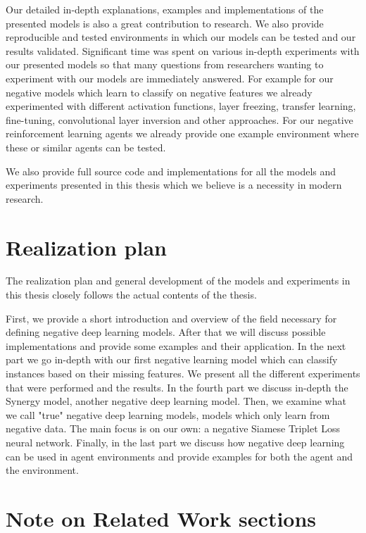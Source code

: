 \documentclass[b5paper]{book}
\begin{document}
Our detailed in-depth explanations, examples and implementations of the presented models is also a great contribution to research. We also provide reproducible and tested environments in which our models can be tested and our results validated. Significant time was spent on various in-depth experiments with our presented models so that many questions from researchers wanting to experiment with our models are immediately answered. For example for our negative models which learn to classify on negative features we already experimented with different activation functions, layer freezing, transfer learning, fine-tuning, convolutional layer inversion and other approaches. For our negative reinforcement learning agents we already provide one example environment where these or similar agents can be tested.

We also provide full source code and implementations for all the models and experiments presented in this thesis which we believe is a necessity in modern research.

\section{Realization plan}

The realization plan and general development of the models and experiments in this thesis closely follows the actual contents of the thesis.

First, we provide a short introduction and overview of the field necessary for defining negative deep learning models. After that we will discuss possible implementations and provide some examples and their application. In the next part we go in-depth with our first negative learning model which can classify instances based on their missing features. We present all the different experiments that were performed and the results. In the fourth part we discuss in-depth the Synergy model, another negative deep learning model. Then, we examine what we call "true" negative deep learning models, models which only learn from negative data. The main focus is on our own: a negative Siamese Triplet Loss neural network. Finally, in the last part we discuss how negative deep learning can be used in agent environments and provide examples for both the agent and the environment.

\section{Note on Related Work sections}
\end{document}
